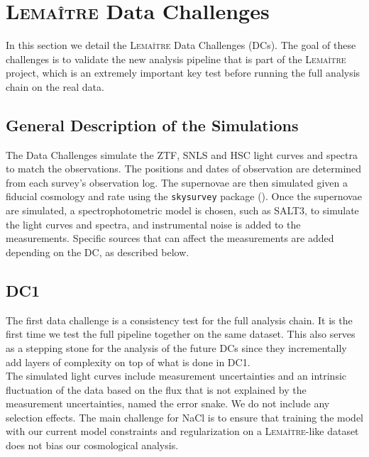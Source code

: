 \section{\textsc{Lemaître} Data Challenges}

In this section we detail the \textsc{Lemaître} Data Challenges (DCs). The goal of these challenges is to validate the new analysis pipeline that is part of the 
\textsc{Lemaître} project, which is an extremely important key test before running the full analysis chain on the real data. 

\subsection{General Description of the Simulations}

The Data Challenges simulate the ZTF, SNLS and HSC light curves and spectra to match the observations. The positions and dates of observation are determined from each 
survey's observation log. The supernovae are then simulated given a fiducial cosmology and rate using the \texttt{skysurvey} package (\cite{Rigault_2026}). Once the supernovae 
are simulated, a spectrophotometric model is chosen, such as SALT3, to simulate the light curves and spectra, and instrumental noise is added to the measurements. 
Specific sources that can affect the measurements are added depending on the DC, as described below. \\

\subsection{DC1}

The first data challenge is a consistency test for the full analysis chain. It is the first time we test the full pipeline together on the same dataset. 
This also serves as a stepping stone for the analysis of the future DCs since they incrementally add layers of complexity on top of what is done in DC1. \\

The simulated light curves include measurement uncertainties and an intrinsic fluctuation of the data based on the flux that is not explained by the measurement 
uncertainties, named the error snake. We do not include any selection effects. The main challenge for NaCl is to ensure that training the model with our current 
model constraints and regularization on a \textsc{Lemaître}-like dataset does not bias our cosmological analysis. \\

